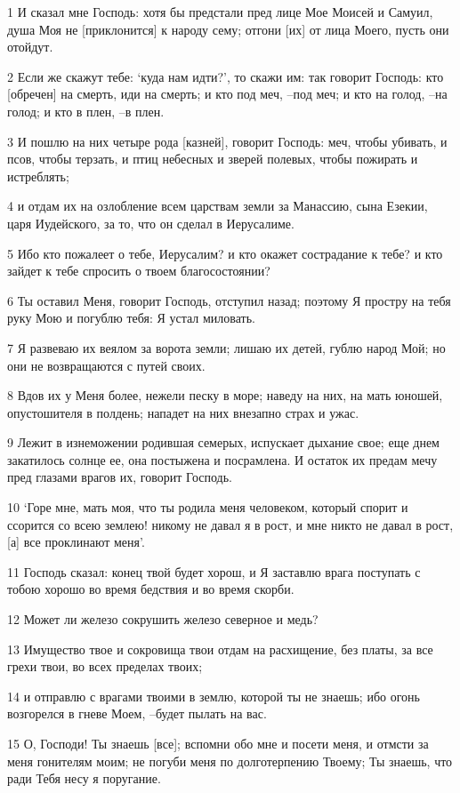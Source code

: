\par 1 И сказал мне Господь: хотя бы предстали пред лице Мое Моисей и Самуил, душа Моя не [приклонится] к народу сему; отгони [их] от лица Моего, пусть они отойдут.
\par 2 Если же скажут тебе: `куда нам идти?', то скажи им: так говорит Господь: кто [обречен] на смерть, иди на смерть; и кто под меч, --под меч; и кто на голод, --на голод; и кто в плен, --в плен.
\par 3 И пошлю на них четыре рода [казней], говорит Господь: меч, чтобы убивать, и псов, чтобы терзать, и птиц небесных и зверей полевых, чтобы пожирать и истреблять;
\par 4 и отдам их на озлобление всем царствам земли за Манассию, сына Езекии, царя Иудейского, за то, что он сделал в Иерусалиме.
\par 5 Ибо кто пожалеет о тебе, Иерусалим? и кто окажет сострадание к тебе? и кто зайдет к тебе спросить о твоем благосостоянии?
\par 6 Ты оставил Меня, говорит Господь, отступил назад; поэтому Я простру на тебя руку Мою и погублю тебя: Я устал миловать.
\par 7 Я развеваю их веялом за ворота земли; лишаю их детей, гублю народ Мой; но они не возвращаются с путей своих.
\par 8 Вдов их у Меня более, нежели песку в море; наведу на них, на мать юношей, опустошителя в полдень; нападет на них внезапно страх и ужас.
\par 9 Лежит в изнеможении родившая семерых, испускает дыхание свое; еще днем закатилось солнце ее, она постыжена и посрамлена. И остаток их предам мечу пред глазами врагов их, говорит Господь.
\par 10 `Горе мне, мать моя, что ты родила меня человеком, который спорит и ссорится со всею землею! никому не давал я в рост, и мне никто не давал в рост, [а] все проклинают меня'.
\par 11 Господь сказал: конец твой будет хорош, и Я заставлю врага поступать с тобою хорошо во время бедствия и во время скорби.
\par 12 Может ли железо сокрушить железо северное и медь?
\par 13 Имущество твое и сокровища твои отдам на расхищение, без платы, за все грехи твои, во всех пределах твоих;
\par 14 и отправлю с врагами твоими в землю, которой ты не знаешь; ибо огонь возгорелся в гневе Моем, --будет пылать на вас.
\par 15 О, Господи! Ты знаешь [все]; вспомни обо мне и посети меня, и отмсти за меня гонителям моим; не погуби меня по долготерпению Твоему; Ты знаешь, что ради Тебя несу я поругание.

